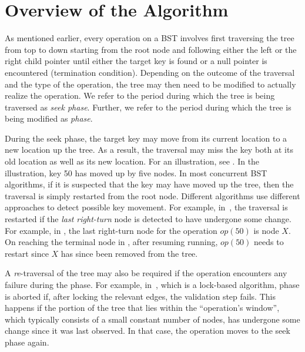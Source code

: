 \section{Overview of the Algorithm}
\label{sec:overview}

As mentioned earlier, every operation on a BST involves first traversing the tree from top to down starting from the root node and following either the left or the right child pointer until either the target key is found or a null pointer is encountered (termination condition). Depending on the outcome of the traversal and the type of the operation, the 
tree may then need to be modified to actually realize the operation. We refer to the period during which the tree is being traversed as \emph{seek phase}. Further, we refer to the period during which the tree is being modified as \emph{\action{} phase}.

During the seek phase, the target key may move from its current location to a new location up the tree. As a result, the traversal may miss the key both at its old location as well as its new location. For an illustration, see . In the illustration, key 50 has moved up by five nodes. In most concurrent BST algorithms, if it is suspected that the key may have moved up the tree, then the traversal is simply restarted from the root node. Different algorithms use different approaches to detect possible key movement. For example, in~\cite{HowJon:2012:SPAA}, the traversal is restarted if the \emph{last right-turn} node is detected to have undergone some change. For example, in , the last right-turn node for the operation $op(50)$ is node $X$. On reaching the terminal node in , after resuming running, $op(50)$ needs to restart since $X$ has since been removed from the tree. 

A \emph{re}-traversal of the tree may also be required if the operation encounters any failure during the \action{} phase. For example, in~\cite{RamMit:2015:PPoPP}, which is a lock-based algorithm, \action{} phase is aborted if, after locking the relevant edges, the validation step fails. This happens if the portion of the tree that lies within the ``operation's window'', which typically consists of a small constant number of nodes, has undergone some change since it was last observed. In that case, the operation moves to the seek phase again. 

